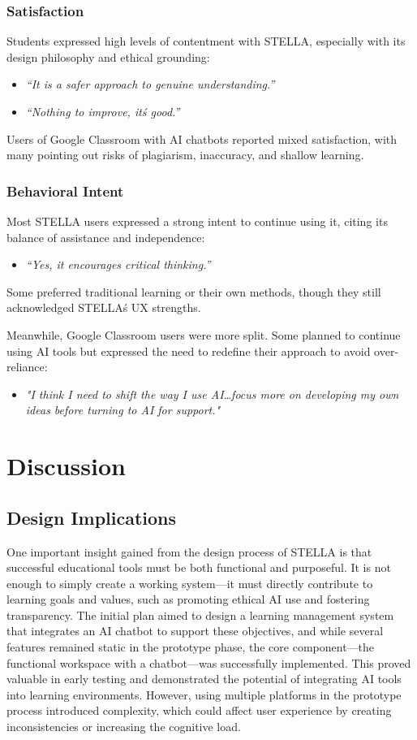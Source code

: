 \documentclass[sigconf,natbib=true]{acmart}
\begin{document}
\subsubsection{Satisfaction}
Students expressed high levels of contentment with STELLA, especially with its design philosophy and ethical grounding:
\begin{itemize}
  \item \textit{“It is a safer approach to genuine understanding.”}
  \item \textit{“Nothing to improve, it\'s good.”}
\end{itemize}
Users of Google Classroom with AI chatbots reported mixed satisfaction, with many pointing out risks of plagiarism, inaccuracy, and shallow learning.

\subsubsection{Behavioral Intent}
Most STELLA users expressed a strong intent to continue using it, citing its balance of assistance and independence:
\begin{itemize}
  \item \textit{“Yes, it encourages critical thinking.”}
\end{itemize}
Some preferred traditional learning or their own methods, though they still acknowledged STELLA\'s UX strengths.

Meanwhile, Google Classroom users were more split. Some planned to continue using AI tools but expressed the need to redefine their approach to avoid over-reliance:
\begin{itemize}
  \item \textit{"I think I need to shift the way I use AI\ldots focus more on developing my own ideas before turning to AI for support."}
\end{itemize}

\section{Discussion}
\subsection{Design Implications}
One important insight gained from the design process of STELLA is that successful educational tools must be both functional and purposeful. It is not enough to simply create a working system—it must directly contribute to learning goals and values, such as promoting ethical AI use and fostering transparency. The initial plan aimed to design a learning management system that integrates an AI chatbot to support these objectives, and while several features remained static in the prototype phase, the core component—the functional workspace with a chatbot—was successfully implemented. This proved valuable in early testing and demonstrated the potential of integrating AI tools into learning environments. However, using multiple platforms in the prototype process introduced complexity, which could affect user experience by creating inconsistencies or increasing the cognitive load.
\end{document}
